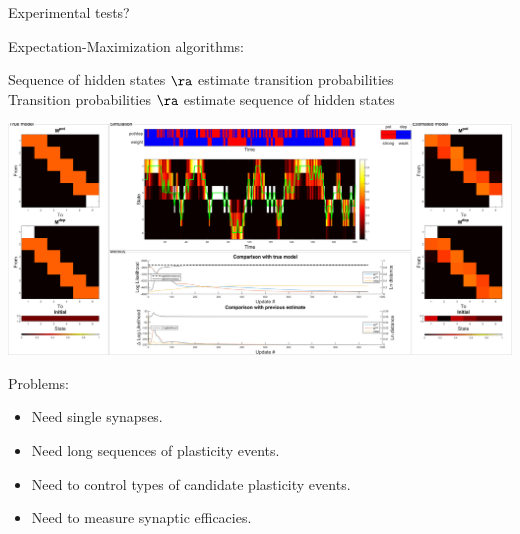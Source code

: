 \documentclass[final,hyperref={pdfpagelabels=false,bookmarks=false}]{beamer}
\begin{document}
\begin{frame}{}
\begin{columns}[t]
\begin{column}{0.33\linewidth}
\begin{block}{Experimental tests?}
\begin{center}
\begin{inlineenumerate}
     \item {} \hspace{0.02\linewidth}
     \item {}
   \end{inlineenumerate}
 \end{center}

 \vp Expectation-Maximization algorithms:
 \parbox[t]{0.5\linewidth}{
   Sequence of hidden states $\ra$ estimate transition probabilities \\
   Transition probabilities $\ra$ estimate sequence of hidden states
 }
 
 \begin{center}
   \includegraphics[width=0.87\linewidth]{FitVid939.svg}
 \end{center}
%

 \vp Problems:
 \begin{itemize}
   \item Need single synapses.
   \item Need long sequences of plasticity events.
   \item Need to control types of candidate plasticity events.
   \item Need to measure synaptic efficacies.
 \end{itemize}
%
\end{block}


\end{column}
\end{columns}
\end{frame}
\end{document}
